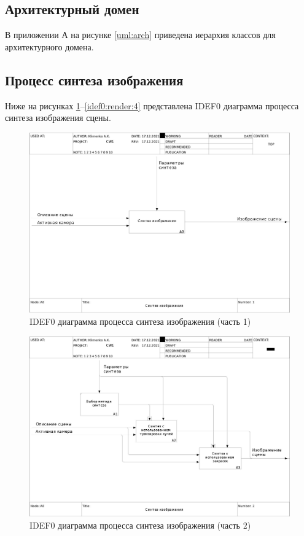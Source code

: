 \subsection{Архитектурный домен}

В приложении А на рисунке \ref{uml:arch} приведена иерархия классов для архитектурного домена.

\subsection{Процесс синтеза изображения}

Ниже на рисунках \ref{idef0:render:1}--\ref{idef0:render:4} представлена IDEF0 диаграмма процесса синтеза изображения сцены.

\begin{figure}[ht]
    \centering
    \includegraphics[width=\linewidth,height=0.85\textheight,keepaspectratio]{idef0/01_A0.jpg}
    \caption{IDEF0 диаграмма процесса синтеза изображения (часть 1)}
    \label{idef0:render:1}
\end{figure}

\begin{figure}
    \centering
    \includegraphics[width=\linewidth,height=0.85\textheight,keepaspectratio]{idef0/02_A0.jpg}
    \caption{IDEF0 диаграмма процесса синтеза изображения (часть 2)}
    \label{idef0:render:2}
\end{figure}

